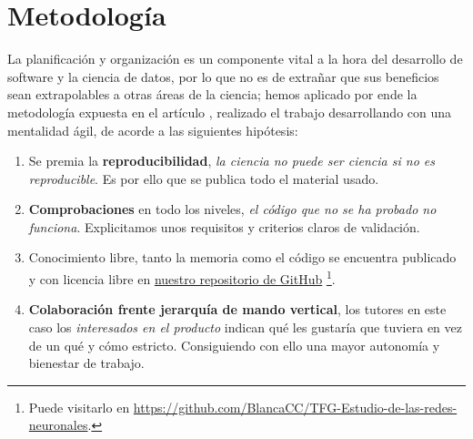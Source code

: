 %

\chapter{Metodología}

La planificación y organización es un componente vital a la hora del desarrollo de software 
y la ciencia de datos, por lo que no es de extrañar que sus beneficios sean extrapolables
a otras áreas de la ciencia; 
hemos aplicado por ende la 
metodología expuesta en el artículo \cite{DBLP:journals/corr/abs-2104-12545}, realizado 
el trabajo desarrollando con una mentalidad ágil, de acorde a las siguientes hipótesis: 

\begin{enumerate}
    \item Se premia la \textbf{reproducibilidad}, \textit{la ciencia no puede ser ciencia si no es reproducible}. Es por 
    ello que se publica todo el material usado. 
    \item \textbf{Comprobaciones} en todo los niveles, \textit{el código que no se ha probado no funciona}. 
    Explicitamos unos requisitos y criterios claros de validación. 
    \item Conocimiento libre, tanto la memoria como el código se encuentra publicado y con licencia libre en \href{https://github.com/BlancaCC/TFG-Estudio-de-las-redes-neuronales}{nuestro repositorio 
    de GitHub} \footnote{Puede visitarlo en \url{https://github.com/BlancaCC/TFG-Estudio-de-las-redes-neuronales}.}.
    \item \textbf{Colaboración frente jerarquía de mando vertical}, los tutores en este caso 
    los \textit{interesados en el producto} 
    indican qué les gustaría que tuviera en vez de un qué y cómo estricto. Consiguiendo con ello una mayor autonomía y bienestar de trabajo.
     
\end{enumerate}  


